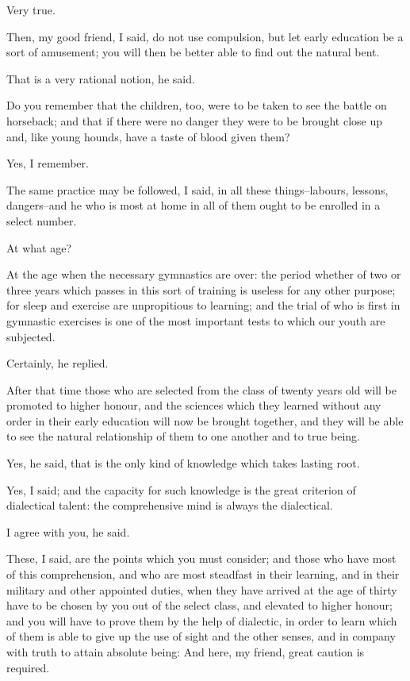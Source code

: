 Very true.

Then, my good friend, I said, do not use compulsion, but let early
education be a sort of amusement; you will then be better able to find
out the natural bent.

That is a very rational notion, he said.

Do you remember that the children, too, were to be taken to see the
battle on horseback; and that if there were no danger they were to be
brought close up and, like young hounds, have a taste of blood given
them?

Yes, I remember.

The same practice may be followed, I said, in all these things--labours,
lessons, dangers--and he who is most at home in all of them ought to be
enrolled in a select number.

At what age?

At the age when the necessary gymnastics are over: the period whether of
two or three years which passes in this sort of training is useless for
any other purpose; for sleep and exercise are unpropitious to learning;
and the trial of who is first in gymnastic exercises is one of the most
important tests to which our youth are subjected.

Certainly, he replied.

After that time those who are selected from the class of twenty years
old will be promoted to higher honour, and the sciences which they
learned without any order in their early education will now be brought
together, and they will be able to see the natural relationship of them
to one another and to true being.

Yes, he said, that is the only kind of knowledge which takes lasting
root.

Yes, I said; and the capacity for such knowledge is the great criterion
of dialectical talent: the comprehensive mind is always the dialectical.

I agree with you, he said.

These, I said, are the points which you must consider; and those who
have most of this comprehension, and who are most steadfast in their
learning, and in their military and other appointed duties, when they
have arrived at the age of thirty have to be chosen by you out of the
select class, and elevated to higher honour; and you will have to prove
them by the help of dialectic, in order to learn which of them is able
to give up the use of sight and the other senses, and in company with
truth to attain absolute being: And here, my friend, great caution is
required.

